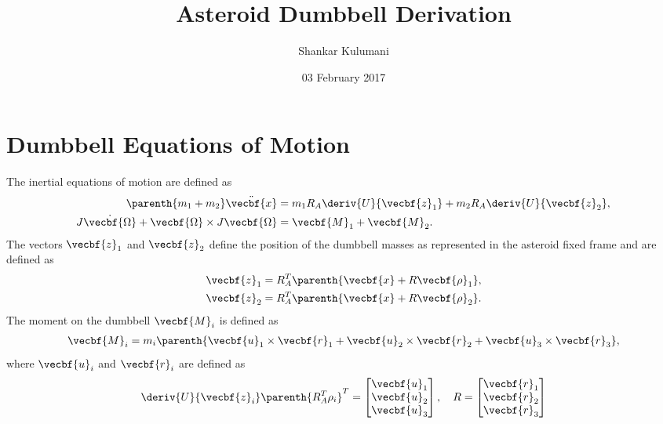 \documentclass[11pt, reqno]{article}    %
\title{Asteroid Dumbbell Derivation}
\author{Shankar Kulumani}
\date{03 February 2017}                         %
\begin{document}
\maketitle

\section[EOM Summary]{Dumbbell Equations of Motion}\label{sec:asteroid}

The inertial equations of motion are defined as
\begin{align}
    \parenth{m_1 + m_2} \ddot{\vecbf{x}} &= m_1 R_A \deriv{U}{\vecbf{z}_1} + m_2 R_A \deriv{U}{\vecbf{z}_2}, \\
    J \dot{\vecbf{\Omega}} + \vecbf{\Omega} \times J \vecbf{\Omega} &= \vecbf{M}_1 + \vecbf{M}_2.
\end{align}
The vectors \( \vecbf{z}_1 \) and \( \vecbf{z}_2\) define the position of the dumbbell masses as represented in the asteroid fixed frame and are defined as
\begin{align}
    \vecbf{z}_1 &= R_A^T \parenth{\vecbf{x} + R \vecbf{\rho}_1} , \\
    \vecbf{z}_2 &= R_A^T \parenth{\vecbf{x} + R \vecbf{\rho}_2}.
\end{align}
The moment on the dumbbell \( \vecbf{M}_i\) is defined as
\begin{align}
    \vecbf{M}_i = m_i \parenth{ \vecbf{u}_1 \times \vecbf{r}_1 + \vecbf{u}_2 \times \vecbf{r}_2 + \vecbf{u}_3 \times \vecbf{r}_3},
\end{align}
where \( \vecbf{u}_i \) and \( \vecbf{r}_i \) are defined as
\begin{align*}
    \deriv{U}{\vecbf{z}_i} \parenth{R_A^T \rho_i}^T = \begin{bmatrix}\vecbf{u}_1 \\ \vecbf{u}_2 \\ \vecbf{u}_3 \end{bmatrix} ,
    \quad
    R = \begin{bmatrix}\vecbf{r}_1 \\\vecbf{r}_2 \\ \vecbf{r}_3 \end{bmatrix}
\end{align*}
\end{document}
